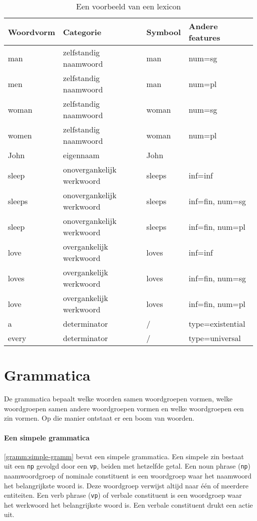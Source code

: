 \begin{table}[!]
  \centering
  \begin{tabular}{@{}llll@{}}
    \toprule
    \textbf{Woordvorm} & \textbf{Categorie} & \textbf{Symbool} & \textbf{Andere features} \\ \midrule
    man                & zelfstandig naamwoord     & man     & num=sg            \\
    men                & zelfstandig naamwoord     & man     & num=pl            \\
    woman              & zelfstandig naamwoord     & woman   & num=sg            \\
    women              & zelfstandig naamwoord     & woman   & num=pl            \\
    John               & eigennaam                 & John    &                   \\
    sleep              & onovergankelijk werkwoord & sleeps  & inf=inf           \\
    sleeps             & onovergankelijk werkwoord & sleeps  & inf=fin, num=sg   \\
    sleep              & onovergankelijk werkwoord & sleeps  & inf=fin, num=pl   \\
    love               & overgankelijk werkwoord   & loves   & inf=inf           \\
    loves              & overgankelijk werkwoord   & loves   & inf=fin, num=sg   \\
    love               & overgankelijk werkwoord   & loves   & inf=fin, num=pl   \\
    a                  & determinator              & /       & type=existential  \\
    every              & determinator              & /       & type=universal    \\
    \bottomrule
  \end{tabular}
  \caption{Een voorbeeld van een lexicon}
  \label{tbl:lexicon}
\end{table}

\section{Grammatica}
De grammatica bepaalt welke woorden samen woordgroepen vormen, welke woordgroepen samen andere woordgroepen vormen en welke woordgroepen een zin vormen. Op die manier ontstaat er een boom van woorden.

\paragraph{Een simpele grammatica} \autoref{gramm:simple-gramm} bevat een simpele grammatica. Een simpele zin bestaat uit een \texttt{np} gevolgd door een \texttt{vp}, beiden met hetzelfde getal. Een noun phrase (\texttt{np}) naamwoordgroep of nominale constituent is een woordgroep waar het naamwoord het belangrijkste woord is. Deze woordgroep verwijst altijd naar één of meerdere entiteiten. Een verb phrase (\texttt{vp}) of verbale constituent is een woordgroep waar het werkwoord het belangrijkste woord is. Een verbale constituent drukt een actie uit.

